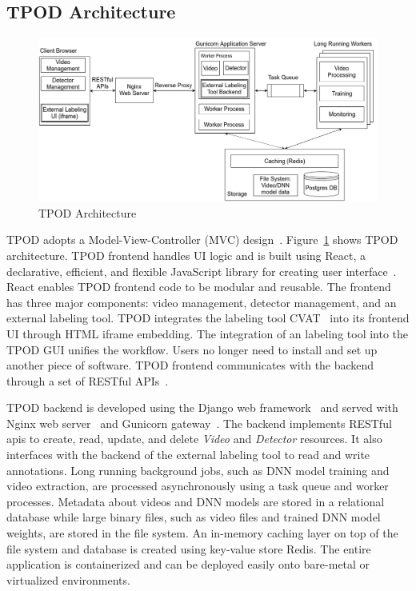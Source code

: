 \subsection{TPOD Architecture}

\begin{figure}[]
  \hspace{-.1in}
    \includegraphics[width=1.1\textwidth]{FIGS/tpod-arch}
    \caption{TPOD Architecture}
  \label{figs:tpod-arch}
\end{figure}

TPOD adopts a Model-View-Controller (MVC) design~\cite{krasner1988description}.
Figure~\ref{figs:tpod-arch} shows TPOD architecture. TPOD frontend handles UI
logic and is built using React, a declarative, efficient, and flexible
JavaScript library for creating user interface~\cite{staff2016react}. React
enables TPOD frontend code to be modular and reusable. The frontend has three
major components: video management, detector management, and an external
labeling tool. TPOD integrates the labeling tool CVAT~\cite{cvat2019} into its
frontend UI through HTML iframe embedding. The integration of an labeling tool
into the TPOD GUI unifies the workflow. Users no longer need to install and set
up another piece of software. TPOD frontend communicates with the backend
through a set of RESTful APIs~\cite{richardson2008restful}. 

TPOD backend is developed using the Django web
framework~\cite{holovaty2009definitive} and served with Nginx web
server~\cite{nedelcu2010nginx} and Gunicorn gateway~\cite{gunicorn2017http}. The
backend implements RESTful apis to create, read, update, and delete
\textit{Video} and \textit{Detector} resources. It also interfaces with the
backend of the external labeling tool to read and write annotations. Long
running background jobs, such as DNN model training and video extraction, are
processed asynchronously using a task queue and worker processes. Metadata about
videos and DNN models are stored in a relational database while large binary
files, such as video files and trained DNN model weights, are stored in the file
system. An in-memory caching layer on top of the file system and database is
created using key-value store Redis. The entire application is containerized and
can be deployed easily onto bare-metal or virtualized environments.

